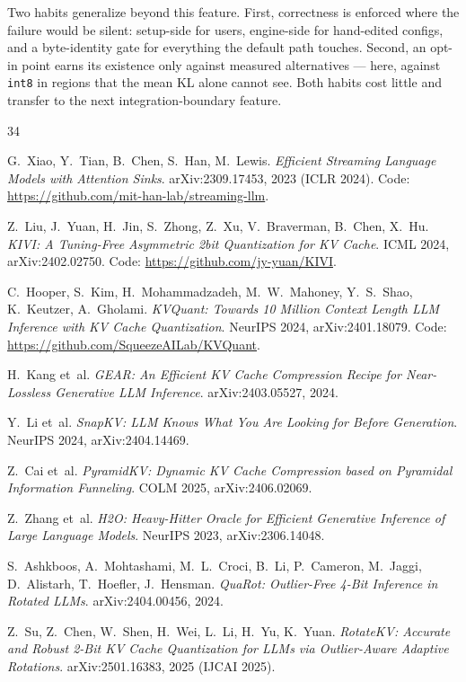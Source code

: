 \documentclass[10pt,twocolumn]{article}
\begin{document}
Two habits generalize beyond this feature. First, correctness is enforced where the failure would be silent: setup-side for users, engine-side for hand-edited configs, and a byte-identity gate for everything the default path touches. Second, an opt-in point earns its existence only against measured alternatives --- here, against \texttt{int8} in regions that the mean KL alone cannot see. Both habits cost little and transfer to the next integration-boundary feature.

\begin{thebibliography}{34}
\setlength{\itemsep}{0pt}\footnotesize

G.~Xiao, Y.~Tian, B.~Chen, S.~Han, M.~Lewis.
\emph{Efficient Streaming Language Models with Attention Sinks}.
arXiv:2309.17453, 2023 (ICLR 2024). Code: \url{https://github.com/mit-han-lab/streaming-llm}.

Z.~Liu, J.~Yuan, H.~Jin, S.~Zhong, Z.~Xu, V.~Braverman, B.~Chen, X.~Hu.
\emph{KIVI: A Tuning-Free Asymmetric 2bit Quantization for KV Cache}.
ICML 2024, arXiv:2402.02750. Code: \url{https://github.com/jy-yuan/KIVI}.

C.~Hooper, S.~Kim, H.~Mohammadzadeh, M.~W.~Mahoney, Y.~S.~Shao, K.~Keutzer, A.~Gholami.
\emph{KVQuant: Towards 10 Million Context Length LLM Inference with KV Cache Quantization}.
NeurIPS 2024, arXiv:2401.18079. Code: \url{https://github.com/SqueezeAILab/KVQuant}.

H.~Kang et~al.
\emph{GEAR: An Efficient KV Cache Compression Recipe for Near-Lossless Generative LLM Inference}.
arXiv:2403.05527, 2024.

Y.~Li et~al.
\emph{SnapKV: LLM Knows What You Are Looking for Before Generation}.
NeurIPS 2024, arXiv:2404.14469.

Z.~Cai et~al.
\emph{PyramidKV: Dynamic KV Cache Compression based on Pyramidal Information Funneling}.
COLM 2025, arXiv:2406.02069.

Z.~Zhang et~al.
\emph{H2O: Heavy-Hitter Oracle for Efficient Generative Inference of Large Language Models}.
NeurIPS 2023, arXiv:2306.14048.

S.~Ashkboos, A.~Mohtashami, M.~L.~Croci, B.~Li, P.~Cameron, M.~Jaggi, D.~Alistarh, T.~Hoefler, J.~Hensman.
\emph{QuaRot: Outlier-Free 4-Bit Inference in Rotated LLMs}.
arXiv:2404.00456, 2024.

Z.~Su, Z.~Chen, W.~Shen, H.~Wei, L.~Li, H.~Yu, K.~Yuan.
\emph{RotateKV: Accurate and Robust 2-Bit KV Cache Quantization for LLMs via Outlier-Aware Adaptive Rotations}.
arXiv:2501.16383, 2025 (IJCAI 2025).


\end{thebibliography}
\end{document}
